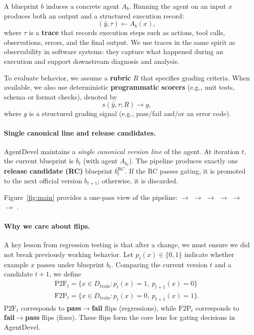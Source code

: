 \documentclass[11pt]{article}
\begin{document}
A blueprint $b$ induces a concrete agent $A_b$. 
Running the agent on an input $x$ produces both an output and a structured execution record:
\[
(\hat{y}, \tau) \leftarrow A_b(x),
\]
where $\tau$ is a \textbf{trace} that records execution steps such as actions, tool calls, observations, errors, and the final output. 
We use traces in the same spirit as observability in software systems: they capture what happened during an execution and support downstream diagnosis and analysis.

To evaluate behavior, we assume a \textbf{rubric} $R$ that specifies grading criteria. 
When available, we also use deterministic \textbf{programmatic scorers} (e.g., unit tests, schema or format checks), denoted by
\[
s(\hat{y}, \tau; R) \rightarrow g,
\]
where $g$ is a structured grading signal (e.g., pass/fail and/or an error code).

\paragraph{Single canonical line and release candidates.}
AgentDevel maintains a \emph{single canonical version line} of the agent.
At iteration $t$, the current blueprint is $b_t$ (with agent $A_{b_t}$). 
The pipeline produces exactly one \textbf{release candidate (RC)} blueprint $b_t^{\text{RC}}$.
If the RC passes gating, it is promoted to the next official version $b_{t+1}$; otherwise, it is discarded.

Figure~\ref{fig:main} provides a one-pass view of the pipeline:
 $\rightarrow$  $\rightarrow$  $\rightarrow$  $\rightarrow$  $\rightarrow$  $\rightarrow$ .

\paragraph{Why we care about flips.}
A key lesson from regression testing is that after a change, we must ensure we did not break previously working behavior.
Let $p_t(x)\in\{0,1\}$ indicate whether example $x$ passes under blueprint $b_t$.
Comparing the current version $t$ and a candidate $t{+}1$, we define
\begin{align}
\mathrm{P2F}_t = \{x \in D_{\text{train}} : p_t(x)=1,\ p_{t+1}(x)=0\}
\\
\mathrm{F2P}_t = \{x \in D_{\text{train}} : p_t(x)=0,\ p_{t+1}(x)=1\}.
\end{align}
$\mathrm{P2F}_t$ corresponds to \textbf{pass$\rightarrow$fail} flips (regressions), while $\mathrm{F2P}_t$ corresponds to \textbf{fail$\rightarrow$pass} flips (fixes).
These flips form the core lens for gating decisions in AgentDevel.
\end{document}
